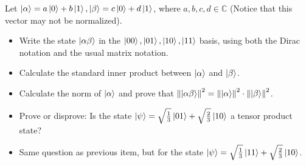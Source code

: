 Let $\ket{\alpha} = a\ket{0}+b\ket{1}, \ket{\beta} = c\ket{0}+d\ket{1}$, where $a,b,c,d\in\mathbb{C}$ (Notice that this vector may not be normalized).
\begin{itemize}
    \item[a)] Write the state $\ket{\alpha\beta}$ in the ${\ket{00},\ket{01},\ket{10},\ket{11}}$ basis, using both the Dirac notation and the usual matrix notation.
    \item[b)] Calculate the standard inner product between $\ket{\alpha}$ and $\ket{\beta}$.
    \item[c)] Calculate the norm of $\ket{\alpha}$ and prove that $\norm{\ket{\alpha\beta}}^2 = \norm{\ket{\alpha}}^2\cdot\norm{\ket{\beta}}^2$.
    \item[d)] Prove or disprove: Is the state $\ket{\psi}=\sqrt{\frac{1}{3}}\ket{01} + \sqrt{\frac{2}{3}}\ket{10}$ a tensor product state?
    \item[e)] Same question as previous item, but for the state $\ket{\psi}=\sqrt{\frac{1}{3}}\ket{11} + \sqrt{\frac{2}{3}}\ket{10}$.
\end{itemize}
